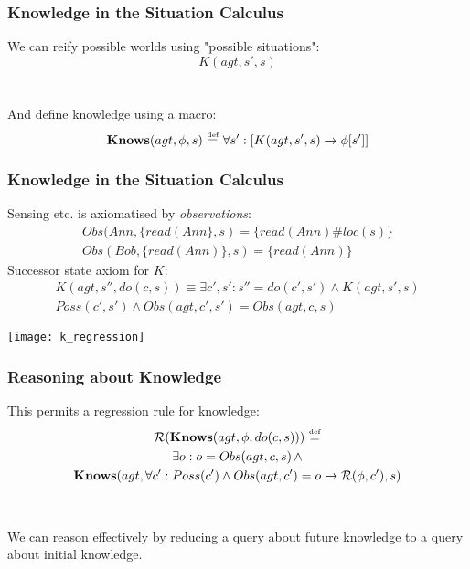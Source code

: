 \documentclass[compress]{beamer}
\newcommand{\isdef}{\hbox{$\stackrel{\mbox{\tiny def}}{=}$}}
\newcommand{\Reg}{\mathcal{R}}
\newcommand{\Knows}{\mathbf{Knows}}
\begin{document}
\begin{frame}
\frametitle{Knowledge in the Situation Calculus}
We can reify possible worlds using "possible situations":
\begin{equation*}
 K(agt,s',s)
\end{equation*}
\ \\
\ \\
And define knowledge using a macro:
\begin{equation*}
\Knows(agt,\phi,s)\,\,\isdef\,\,\forall s': \left[ K(agt,s',s) \rightarrow \phi[s']\right]
\end{equation*}
\end{frame}

\begin{frame}
\frametitle{Knowledge in the Situation Calculus}
Sensing etc. is axiomatised by \emph{observations}:
\begin{gather*}
Obs(Ann,\{read(Ann\},s) = \{read(Ann)\#loc(s)\}\\
Obs(Bob,\{read(Ann)\},s) = \{read(Ann)\}
\end{gather*}
\pause
Successor state axiom for $K$:
\begin{multline*}
K(agt,s'',do(c,s)) \equiv \exists c',s': s'' = do(c',s') \wedge K(agt,s',s)\\
  Poss(c',s') \wedge Obs(agt,c',s') = Obs(agt,c,s)
\end{multline*}
\end{frame}

\begin{frame}
\begin{center}
  \texttt{[image: k\_regression]}
\end{center}
\end{frame}

\begin{frame}
\frametitle{Reasoning about Knowledge}
This permits a regression rule for knowledge:
\begin{multline*}
\Reg(\Knows(agt,\phi,do(c,s)))\,\,\isdef \\
  \exists o: o = Obs(agt,c,s)\,\wedge \\
  \Knows(agt,\forall c': Poss(c')\wedge Obs(agt,c')=o \rightarrow \Reg(\phi,c'),s)
\end{multline*}
\ \\
\ \\
We can reason effectively by reducing a query about future knowledge to a query about initial knowledge.
\end{frame}
\end{document}
